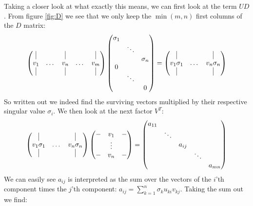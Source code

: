 Taking a closer look at what exactly this means, we can first look at the term $UD$. From figure \ref{fig:D} we see that we only keep the $\min(m,n)$ first columns of the $D$ matrix:
\begin{equation}
\begin{pmatrix}
\vline &  & \vline& & \vline\\
v_1& \dots & v_n &\dots & v_m\\
\vline & & \vline& & \vline\\
\end{pmatrix}
\begin{pmatrix}
\sigma_1 & & \\
 & \ddots & \\
 &&\sigma_n\\
 0 & & \\
 & \ddots & \\
 & & 0\\
\end{pmatrix}
=
\begin{pmatrix}
\vline &  & \vline\\
v_1\sigma_1& \dots & v_n\sigma_n\\
\vline & & \vline\\
\end{pmatrix}
\end{equation}
So written out we indeed find the surviving vectors multiplied by their respective singular value $\sigma_i$. We then look at the next factor $V^T$:
\begin{equation}
\begin{pmatrix}
\vline &  & \vline\\
v_1\sigma_1& \dots & v_n\sigma_n\\
\vline & & \vline\\
\end{pmatrix}
\begin{pmatrix}
- & v_1 & -\\
& \vdots &\\
- & v_n & -\\
\end{pmatrix}
=
\begin{pmatrix}
a_{11} & & & & \\
& \ddots& & & \\
& & a_{ij} & & \\
& & & \ddots& \\
& & & & a_{mn}\\
\end{pmatrix}
\end{equation}
We can easily see $a_{ij}$ is interpreted as the sum over the vectors of the $i$'th component times the $j$'th component: $a_{ij}=\sum_{k=1}^{n} \sigma_ku_{ki}v_{kj}$. Taking the sum out we find:
